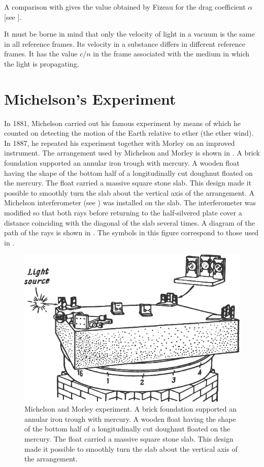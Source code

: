 \noindent
A comparison with  gives the value obtained by Fizeau for the drag coefficient $\alpha$ [see ].

It must be borne in mind that only the velocity of light in a vacuum is the same in all reference frames.
Its velocity in a substance differs in different reference frames.
It has the value $c/n$ in the frame associated with the medium in which the light is propagating.

\section{Michelson's Experiment}\label{sec:21_3}

In 1881, Michelson carried out his famous experiment by means of which he counted on detecting the motion of the Earth relative to ether (the ether wind).
In 1887, he repeated his experiment together with Morley on an improved instrument.
The arrangement used by Michelson and Morley is shown in .
A brick foundation supported an annular iron trough with mercury.
A wooden float having the shape of the bottom half of a longitudinally cut doughnut floated on the mercury.
The float carried a massive square stone slab.
This design made it possible to smoothly turn the slab about the vertical axis of the arrangement.
A Michelson interferometer (see ) was installed on the slab.
The interferometer was modified so that both rays before returning to the half-silvered plate cover a distance coinciding with the diagonal of the slab several times.
A diagram of the path of the rays is shown in .
The symbols in this figure correspond to those used in .

\begin{figure}[t]
	\begin{center}
		\includegraphics[scale=1]{figures/ch_21/fig_21_4.pdf}
        \caption[]{Michelson and Morley experiment. A brick foundation supported an annular iron trough with mercury. A wooden float having the shape of the bottom half of a longitudinally cut doughnut floated on the mercury. The float carried a massive square stone slab. This design made it possible to smoothly turn the slab about the vertical axis of the arrangement.}
		\label{fig:21_4}
	\end{center}
	\vspace{-0.8cm}
\end{figure}

